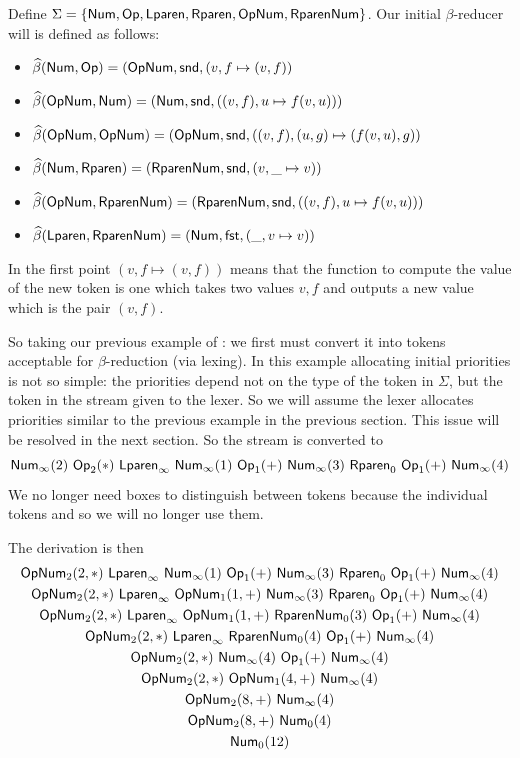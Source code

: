 \documentclass{llncs}
\begin{document}
\begin{example}

    Define $\Sigma=\set{\NUM,\OP,\LPAREN,\RPAREN,\OP\NUM,\RPAREN\NUM}$.
    Our initial $\beta$-reducer will is defined as follows:
    \begin{itemize}
        \item $\widehat\beta(\mathsf{Num},\mathsf{Op})=(\mathsf{Op}\mathsf{Num},\mathsf{snd},(v,f\mapsto(v,f))$
        \item $\widehat\beta(\mathsf{Op}\mathsf{Num},\mathsf{Num})=(\mathsf{Num},\mathsf{snd},((v,f),u\mapsto f(v,u)))$
        \item $\widehat\beta(\mathsf{Op}\mathsf{Num},\mathsf{Op}\mathsf{Num})=(\mathsf{Op}\mathsf{Num},\mathsf{snd},((v,f),(u,g)\mapsto (f(v,u),g))$
        \item $\widehat\beta(\mathsf{Num},\mathsf{Rparen})=(\mathsf{Rparen}\mathsf{Num},\mathsf{snd},(v,\_\mapsto v))$
        \item $\widehat\beta(\mathsf{Op}\mathsf{Num},\mathsf{Rparen}\mathsf{Num})=(\mathsf{Rparen}\mathsf{Num},\mathsf{snd},((v,f),u\mapsto f(v,u)))$
        \item $\widehat\beta(\mathsf{Lparen},\mathsf{Rparen}\mathsf{Num})=(\mathsf{Num},\mathsf{fst},(\_,v\mapsto v))$
    \end{itemize}
    In the first point $(v,f\mapsto(v,f))$ means that the function to compute the value of the new token is one which takes two values $v,f$ and outputs a new value which is the pair $(v,f)$.
    
    So taking our previous example of : we first must convert it into tokens acceptable for $\beta$-reduction (via lexing).
    In this example allocating initial priorities is not so simple: the priorities depend not on the type of the token in $\Sigma$, but the token in the stream given to the lexer.
    So we will assume the lexer allocates priorities similar to the previous example in the previous section.
    This issue will be resolved in the next section.
    So the stream is converted to
    \[ \NUM_\infty(2)\ \OP_2(*)\ \LPAREN_\infty\ \NUM_\infty(1)\ \OP_1(+)\ \NUM_\infty(3)\ \RPAREN_0\ \OP_1(+)\ \NUM_\infty(4) \]
    We no longer need boxes to distinguish between tokens because the individual tokens and so we will no longer use them.

    The derivation is then
    \begin{gather*}
        \OP\NUM_2(2,*)\ \LPAREN_\infty\ \NUM_\infty(1)\ \OP_1(+)\ \NUM_\infty(3)\ \RPAREN_0\ \OP_1(+)\ \NUM_\infty(4) \\
        \OP\NUM_2(2,*)\ \LPAREN_\infty\ \OP\NUM_1(1,+)\ \NUM_\infty(3)\ \RPAREN_0\ \OP_1(+)\ \NUM_\infty(4) \\
        \OP\NUM_2(2,*)\ \LPAREN_\infty\ \OP\NUM_1(1,+)\ \RPAREN\NUM_0(3)\ \OP_1(+)\ \NUM_\infty(4) \\
        \OP\NUM_2(2,*)\ \LPAREN_\infty\ \RPAREN\NUM_0(4)\ \OP_1(+)\ \NUM_\infty(4) \\
        \OP\NUM_2(2,*)\ \NUM_\infty(4)\ \OP_1(+)\ \NUM_\infty(4) \\
        \OP\NUM_2(2,*)\ \OP\NUM_1(4,+)\ \NUM_\infty(4) \\
        \OP\NUM_2(8,+)\ \NUM_\infty(4) \\
        \OP\NUM_2(8,+)\ \NUM_0(4) \\
        \NUM_0(12)
    \end{gather*}

\end{example}
\end{document}
